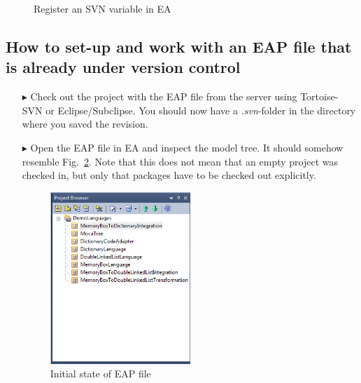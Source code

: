 \begin{figure}[htbp]
\begin{center}
	\caption{Register an SVN variable in EA}
  	\label{fig:advanced-topics-eaSVN-rightclick}
\end{center}
\end{figure}

\subsection{How to set-up and work with an EAP file that is already under version control}

\begin{enumerate}
  \item[$\blacktriangleright$] Check out the project with the EAP file from the server using Tortoise-SVN or Eclipse/Subclipse. 
  You should now have a \textit{.svn}-folder in the directory where you saved the revision.
  \item[$\blacktriangleright$] Open the EAP file in EA and inspect the model tree. 
  It should somehow resemble Fig.~\ref{fig:advanced-topics-eaSVN-initial}.
  Note that this does not mean that an empty project was checked in, but only that packages have to be checked out explicitly.
\begin{figure}[!htbp]
\begin{center}
	\includegraphics[width=0.5\textwidth]{pics/advancedTopics/eaSVN/DemoLanguages/001.png}
	\caption{Initial state of EAP file}
  	\label{fig:advanced-topics-eaSVN-initial}
\end{center}
\end{figure}


\end{enumerate}
